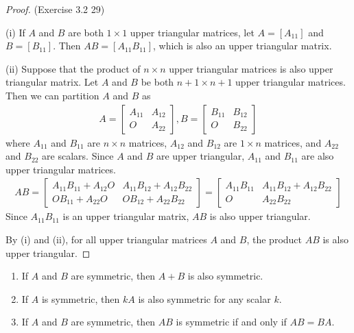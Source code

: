 \begin{proof}
	(Exercise 3.2 29)
	
	\noindent (i) If $A$ and $B$ are both $1 \times 1$ upper triangular matrices, let $A = [A_{11}]$ and $B = [B_{11}]$. Then $AB = [A_{11}B_{11}]$, which is also an upper triangular matrix.
	
	\noindent (ii) Suppose that the product of $n \times n$ upper triangular matrices is also upper triangular matrix. Let $A$ and $B$ be both $n+1 \times n+1$ upper triangular matrices. Then we can partition $A$ and $B$ as
	\begin{align*}
	A = \begin{bmatrix}
	A_{11} & A_{12} \\ O & A_{22}
	\end{bmatrix}, B = \begin{bmatrix}
	B_{11} & B_{12} \\ O & B_{22}
	\end{bmatrix}
	\end{align*} where $A_{11}$ and $B_{11}$ are $n \times n$ matrices, $A_{12}$ and $B_{12}$ are $1 \times n$ matrices, and $A_{22}$ and $B_{22}$ are scalars. Since $A$ and $B$ are upper triangular, $A_{11}$ and $B_{11}$ are also upper triangular matrices.
	\begin{align*}
	AB = \begin{bmatrix}
	A_{11}B_{11} + A_{12}O & A_{11}B_{12} + A_{12}B_{22} \\
	OB_{11} + A_{22}O & OB_{12} + A_{22}B_{22}
	\end{bmatrix} = \begin{bmatrix}
	A_{11}B_{11} & A_{11}B_{12} + A_{12}B_{22} \\
	O & A_{22}B_{22}
	\end{bmatrix}
	\end{align*}
	Since $A_{11}B_{11}$ is an upper triangular matrix, $AB$ is also upper triangular.
	
	\noindent By (i) and (ii), for all upper triangular matrices $A$ and $B$, the product $AB$ is also upper triangular. 
\end{proof}

\begin{plaintheorem}
	\begin{enumerate}
		\item If $A$ and $B$ are symmetric, then $A+B$ is also symmetric.
		\item If $A$ is symmetric, then $kA$ is also symmetric for any scalar $k$.
		\item If $A$ and $B$ are symmetric, then $AB$ is symmetric if and only if $AB = BA$.
	\end{enumerate}
\end{plaintheorem}


